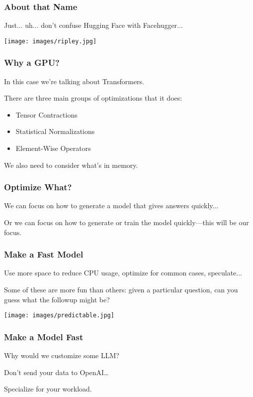 \begin{frame}
\frametitle{About that Name}

Just... uh... don't confuse Hugging Face with Facehugger...

\begin{center}
	\texttt{[image: images/ripley.jpg]}
\end{center}

\end{frame}

\begin{frame}
\frametitle{Why a GPU?}

In this case we're talking about Transformers.

There are three main groups of optimizations that it does:\\
\begin{itemize} 
	\item Tensor Contractions
	\item Statistical Normalizations
	\item Element-Wise Operators
\end{itemize}

We also need to consider what's in memory.

\end{frame}

\begin{frame}
\frametitle{Optimize What?}

We can focus on how to generate a model that gives answers quickly...

Or we can focus on how to generate or train the model quickly---this will be our focus.

\end{frame}

\begin{frame}
\frametitle{Make a Fast Model}

Use more space to reduce CPU usage, optimize for common cases, speculate...

Some of these are more fun than others: given a particular question, can you guess what the followup might be? 

\begin{center}
	\texttt{[image: images/predictable.jpg]}
\end{center}

\end{frame}

\begin{frame}
\frametitle{Make a Model Fast}

Why would we customize some LLM?

Don't send your data to OpenAI\ldots

Specialize for your workload.

\end{frame}

